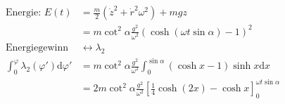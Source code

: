 \begin{enumeralph}
	\begin{align*}
	\text{Energie: }E(t)&=\frac{m}{2}(\dot{z}^2+\dot{r}^2\omega^2)+mgz\\
	&=m\cot^2\alpha\frac{g^2}{\omega^2}(\cosh(\omega t \sin\alpha)-1)^2\\
	\text{Energiegewinn}&\leftrightarrow\lambda_2\\
	\int_{0}^{\varphi}\lambda_2(\varphi')\mathrm{d}\varphi'&=m\cot^2\alpha\frac{g^2}{\omega^2}\int_{0}^{\sin\alpha}(\cosh x -1)\sinh x \mathrm{d}x\\
	&=2m\cot^2\alpha\frac{g^2}{\omega^2}\left[\frac{1}{4}\cosh(2x)-\cosh x\right]_0^{\omega t\sin\alpha}\\
	\end{align*}
\end{enumeralph}

